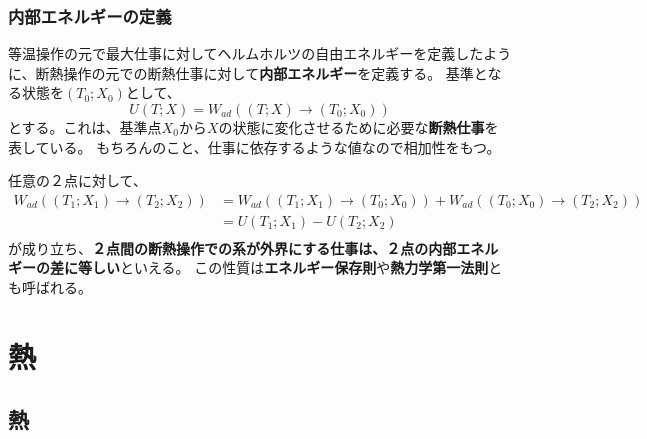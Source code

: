 \documentclass[a4paper]{jsreport}
\begin{document}
            \subsection*{内部エネルギーの定義}    
                等温操作の元で最大仕事に対してヘルムホルツの自由エネルギーを定義したように、断熱操作の元での断熱仕事に対して\textbf{内部エネルギー}を定義する。
                基準となる状態を$(T_0;X_0)$として、
                \begin{equation}
                    U(T; X) = W_{ad}((T;X) \xrightarrow{} (T_0;X_0))
                \end{equation}
                とする。これは、基準点$X_0$から$X$の状態に変化させるために必要な\textbf{断熱仕事}を表している。
                もちろんのこと、仕事に依存するような値なので相加性をもつ。\par
                任意の２点に対して、
                \begin{align}
                    W_{ad}((T_1;X_1) \xrightarrow{} (T_2;X_2)) &= W_{ad}((T_1;X_1) \xrightarrow{} (T_0;X_0)) + W_{ad}((T_0;X_0) \xrightarrow{} (T_2;X_2)) \\
                    &= U(T_1;X_1) - U(T_2;X_2) \\
                \end{align}
                が成り立ち、\textbf{２点間の断熱操作での系が外界にする仕事は、２点の内部エネルギーの差に等しい}といえる。
                この性質は\textbf{エネルギー保存則}や\textbf{熱力学第一法則}とも呼ばれる。


    \chapter{熱}
        \section{熱}
\end{document}
